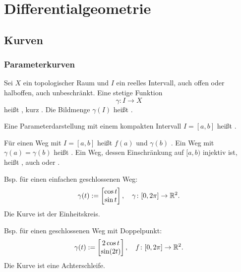
\chapter{Differentialgeometrie}
\section{Kurven}
\subsection{Parameterkurven}

\begin{definition}
Sei $X$ ein topologischer Raum und
$I$ ein reelles Intervall, auch offen oder halboffen, auch unbeschränkt.
Eine stetige Funktion%
\begin{equation}\label{eq:Parameterkurve}
\gamma\colon I\to X
\end{equation}
heißt , kurz
. Die Bildmenge $\gamma(I)$ heißt .

Eine Parameterdarstellung mit einem kompakten Intervall $I=[a,b]$
heißt .

Für einen Weg mit $I=[a,b]$ heißt $f(a)$ 
und $\gamma(b)$ . Ein Weg mit $\gamma(a)=\gamma(b)$
heißt . Ein Weg, dessen Einschränkung auf $[a,b)$
injektiv ist, heißt , auch  oder
.
\end{definition}


Bsp. für einen einfachen geschlossenen Weg:
\begin{equation}
\gamma(t):=\begin{bmatrix}
\cos t\\
\sin t
\end{bmatrix},\quad
\gamma\colon [0,2\pi]\to \mathbb R^2.
\end{equation}
Die Kurve ist der Einheitskreis.

Bsp. für einen geschlossenen Weg mit Doppelpunkt:
\begin{equation}
\gamma(t):=\begin{bmatrix}
2\cos t\\
\sin(2t)
\end{bmatrix},\quad
f\colon [0,2\pi]\to \mathbb R^2.
\end{equation}
Die Kurve ist eine Achterschleife.

